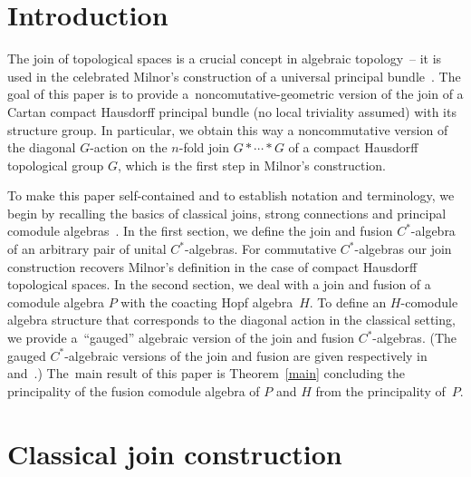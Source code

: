 \documentclass[pdftex]{sigma}
\numberwithin{equation}{section}
\begin{document}



\section{Introduction}

The join of topological spaces is a crucial concept in algebraic topology~--
it is used in the celebrated Milnor's construction
of a universal principal bundle~\cite{m-j56}.  The goal of this paper is to provide
a~noncomutative-geometric version
 of the join of a Cartan compact Hausdorf\/f principal bundle (no local triviality assumed)
with its structure group. In particular, we obtain  this way a noncommutative version
of the   diagonal $G$-action  on the $n$-fold join $G*\cdots*G$
of a compact Hausdorf\/f topological group $G$, which is the
f\/irst step in Milnor's construction.

To make this paper self-contained and to establish notation and terminology, we begin by recalling
the basics of classical joins, strong connections \cite{h-pm96}
and principal comodule algebras~\cite{hkmz11}.
In the f\/irst section, we def\/ine the join and fusion
$C^*$-algebra  of an arbitrary pair of unital \mbox{$C^*$-algebras}. For commutative $C^*$-algebras our join
construction recovers
Milnor's def\/inition in the case of compact Hausdorf\/f topological spaces. In the second section, we deal with a
join and fusion of a comodule algebra $P$ with the coacting
Hopf algebra~$H$.  To def\/ine an $H$-comodule algebra structure that  corresponds
to the diagonal action in the classical setting,
  we provide a~``gauged'' algebraic version of the join and fusion $C^*$-algebras.
(The gauged $C^*$-algebraic versions of the join and fusion are given respectively in~\cite{bdh} and~\cite{ddhw}.)
 The~main result of this paper is Theorem~\ref{main} concluding the principality of the fusion comodule algebra
of $P$ and $H$ from the principality
of~$P$.


\section{Classical join construction}
\end{document}
